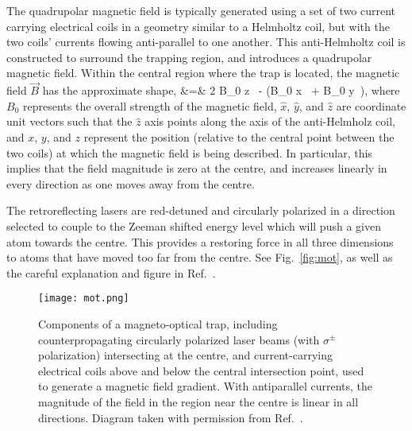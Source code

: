 

The quadrupolar magnetic field is typically generated using a set of two current carrying electrical coils in a geometry similar to a Helmholtz coil, but with the two coils' currents flowing anti-parallel to one another.  This anti-Helmholtz coil is constructed to surround the trapping region, and introduces a quadrupolar magnetic field.  Within the central region where the trap is located, the magnetic field $\vec{B}$ has the approximate shape,
\bea
	 &=& 2 B_0 z \, - (B_0 x \, + B_0 y \,), 
\eea
where $B_0$ represents the overall strength of the magnetic field, $\hat{x}$, $\hat{y}$, and $\hat{z}$ are coordinate unit vectors such that the $\hat{z}$ axis points along the axis of the anti-Helmholz coil, and $x$, $y$, and $z$ represent the position (relative to the central point between the two coils) at which the magnetic field is being described.
In particular, this implies that the field magnitude is zero at the centre, and increases linearly in every direction as one moves away from the centre.

The retroreflecting lasers are red-detuned and circularly polarized in a direction selected to couple to the Zeeman shifted energy level which will push a given atom towards the centre.  This provides a restoring force in all three dimensions to atoms that have moved too far from the centre.  See Fig.~\ref{fig:mot}, as well as the careful explanation and figure in Ref.~\cite{raabprentiss}.

\begin{figure}[h!!!!!t!b]
	\centering
		\texttt{[image: mot.png]}
		\caption[Components of a Magneto-Optical Trap]{Components of a magneto-optical trap, including counterpropagating circularly polarized laser beams (with $\sigma^\pm$ polarization) intersecting at the centre, and current-carrying electrical coils above and below the central intersection point, used to generate a magnetic field gradient.  With antiparallel currents, the magnitude of the field in the region near the centre is linear in all directions.  Diagram taken with permission from Ref.~\cite{thesis}.}
		\label{fig:mot}
    	\label{fig:themot}
\end{figure}


